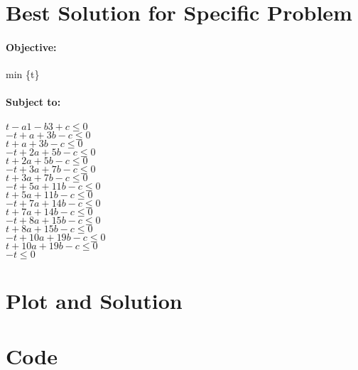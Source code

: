 \documentclass{article}
\begin{document}
\section*{Best Solution for Specific Problem}
\paragraph*{Objective:}
min \{t\}

\paragraph*{Subject to:\\}
$t - a1 - b3 + c \leq 0$\\
$-t + a + 3b - c \leq 0$\\
$t + a + 3b - c \leq 0$\\
$-t + 2a + 5b - c \leq 0$\\
$t + 2a + 5b - c \leq 0$\\
$-t + 3a + 7b - c \leq 0$\\
$t + 3a + 7b - c \leq 0$\\
$-t + 5a + 11b - c \leq 0$\\
$t + 5a + 11b - c \leq 0$\\
$-t + 7a + 14b - c \leq 0$\\
$t + 7a + 14b - c \leq 0$\\
$-t + 8a + 15b - c \leq 0$\\
$t + 8a + 15b - c \leq 0$\\
$-t + 10a + 19b - c \leq 0$\\
$t + 10a + 19b - c \leq 0$\\
$-t \leq 0$\\


\section*{Plot and Solution}

\section*{Code}

\end{document}
